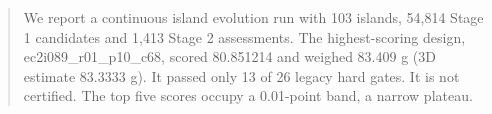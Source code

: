 \begin{abstract}We report a continuous island evolution run with 103 islands, 54,814 Stage 1 candidates and 1,413 Stage 2 assessments. The highest-scoring design, ec2i089\_r01\_p10\_c68, scored 80.851214 and weighed 83.409 g (3D estimate 83.3333 g). It passed only 13 of 26 legacy hard gates. It is not certified. The top five scores occupy a 0.01-point band, a narrow plateau.\end{abstract}
